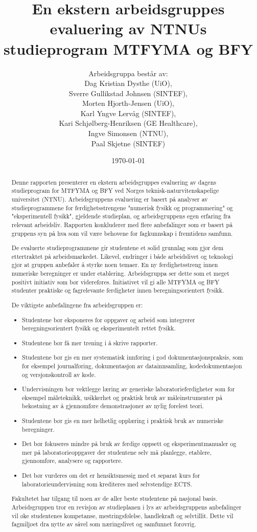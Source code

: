 \documentclass{article}
\title{En ekstern arbeidsgruppes evaluering av NTNUs studieprogram MTFYMA og BFY}
\author{Arbeidsgruppa består av: \\ Dag Kristian Dysthe (UiO), \\ Sverre Gullikstad Johnsen (SINTEF), \\ Morten Hjorth-Jensen (UiO), \\ Karl Yngve Lervåg (SINTEF), \\ Kari Schjølberg-Henriksen (GE Healthcare), \\ Ingve Simonsen (NTNU), \\ Paal Skjetne (SINTEF)}
\date{\today}
\begin{document}
\maketitle

\newpage
\begin{abstract}
Denne rapporten presenterer en ekstern arbeidsgruppes evaluering av dagens studieprogram for MTFYMA og BFY ved Norges teknisk-naturvitenskapelige universitet (NTNU). Arbeidsgruppens evaluering er basert på analyser av studieprogrammene for ferdighetsstrengene "numerisk fysikk og programmering" og "eksperimentell fysikk", gjeldende studieplan, og arbeidsgruppens egen erfaring fra relevant arbeidsliv. Rapporten konkluderer med flere anbefalinger som er basert på gruppens syn på hva som vil være behovene for fagkunnskap i fremtidens samfunn.

De evaluerte studieprogrammene gir studentene et solid grunnlag som gjør dem ettertraktet på arbeidsmarkedet. Likevel, endringer i både arbeidslivet og teknologi gjør at gruppen anbefaler å styrke noen temaer. En ny ferdighetsstreng innen numeriske beregninger er under etablering. Arbeidsgruppa ser dette som et meget positivt initiativ som bør videreføres. Initiativet vil gi alle MTFYMA og BFY studenter praktiske og fagrelevante ferdigheter innen beregningsorientert fysikk. 

De viktigste anbefalingene fra arbeidsgruppen er:
\begin{itemize}
    \item Studentene bør eksponeres for oppgaver og arbeid som integrerer beregningsorientert fysikk og eksperimentelt rettet fysikk.
    \item Studentene bør få mer trening i å skrive rapporter.
  \item Studentene bør gis en mer systematisk innføring i god dokumentasjonspraksis, som for eksempel journalføring, dokumentasjon av datainnsamling, kodedokumentasjon og versjonskontroll av kode.
  \item Undervisningen bør vektlegge læring av generiske laboratorieferdigheter som for eksempel måleteknikk, usikkerhet og praktisk bruk av måleinstrumenter på bekostning av å gjennomføre demonstrasjoner av nylig forelest teori.  
  \item Studentene bør gis en mer helhetlig opplæring i praktisk bruk av numeriske beregninger.
  \item Det bør fokuseres mindre på bruk av ferdige oppsett og eksperimentmanualer og mer på laboratorieoppgaver der studentene selv må planlegge, etablere, gjennomføre, analysere og rapportere.
  \item Det bør vurderes om det er hensiktsmessig med et separat kurs for laboratorieundervisning som krediteres med selvstendige ECTS.  
\end{itemize}

Fakultetet har tilgang til noen av de aller beste studentene på nasjonal basis. Arbeidsgruppen tror en revisjon av studieplanen i lys av arbeidsgruppens anbefalinger vil øke studentenes kompetanse, mestringsfølelse, handlekraft og selvtillit. Dette vil fagmiljøet dra nytte av såvel som næringslivet og samfunnet forøvrig.
\end{abstract}
\end{document}
